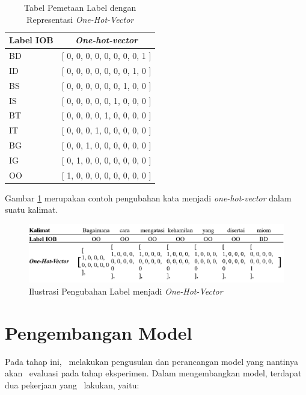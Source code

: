 \begin{table}
	\centering
	\caption{Tabel Pemetaan Label dengan Representasi \textit{One-Hot-Vector}}
	\label{table:onehotlabel}
	\begin{tabular}{|l|l|}
		\hline
		\multicolumn{1}{|c|}{Label IOB} & \multicolumn{1}{c|}{\textit{One-hot-vector}} \\ \hline
		BD & {[} 0, 0, 0, 0, 0, 0, 0, 0, 1 {]} \\ \hline
		ID & {[} 0, 0, 0, 0, 0, 0, 0, 1, 0 {]} \\ \hline
		BS & {[} 0, 0, 0, 0, 0, 0, 1, 0, 0 {]} \\ \hline
		IS & {[} 0, 0, 0, 0, 0, 1, 0, 0, 0 {]} \\ \hline
		BT & {[} 0, 0, 0, 0, 1, 0, 0, 0, 0 {]} \\ \hline
		IT & {[} 0, 0, 0, 1, 0, 0, 0, 0, 0 {]} \\ \hline
		BG & {[} 0, 0, 1, 0, 0, 0, 0, 0, 0 {]} \\ \hline
		IG & {[} 0, 1, 0, 0, 0, 0, 0, 0, 0 {]} \\ \hline
		OO & {[} 1, 0, 0, 0, 0, 0, 0, 0, 0 {]} \\ \hline
	\end{tabular}
\end{table}

Gambar \ref{fig:labeltoone} merupakan contoh pengubahan kata menjadi \textit{one-hot-vector} dalam suatu kalimat.

\begin{figure}
	\centering
	\includegraphics[width=\linewidth]{images/labeltoone}
	\caption{Ilustrasi Pengubahan Label menjadi \textit{One-Hot-Vector}}
	\label{fig:labeltoone}
\end{figure}

\section{Pengembangan Model}
Pada tahap ini, \saya~melakukan pengusulan dan perancangan model yang nantinya akan \saya~evaluasi pada tahap eksperimen. Dalam mengembangkan model, terdapat dua pekerjaan yang \saya~lakukan, yaitu:

